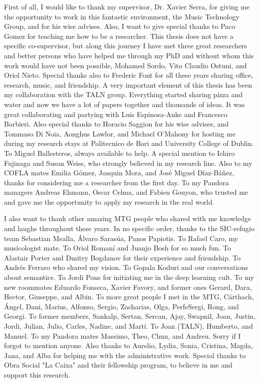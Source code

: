 First of all, I would like to thank my supervisor, Dr. Xavier Serra, for giving me the opportunity to work in this fantastic environment, the Music Technology Group, and for his wise advises. Also, I want to give special thanks to Paco Gomez for teaching me how to be a researcher. This thesis does not have a specific co-supervisor, but along this journey I have met three great researchers and better persons who have helped me through my PhD and without whom this work would have not been possible, Mohamed Sordo, Vito Claudio Ostuni, and Oriol Nieto. 
Special thanks also to Frederic Font for all these years sharing office, research, music, and friendship.
A very important element of this thesis has been my collaboration with the TALN group. Everything started sharing pizza and water and now we have a lot of papers together and thousands of ideas. It was great collaborating and partying with Luis Espinosa-Anke and Francesco Barbieri. Also special thanks to Horacio Saggion for his wise advises, and Tommaso Di Noia, Aonghus Lawlor, and Michael O'Mahony for hosting me during my research stays at Politecnico de Bari and University College of Dublin. To Miguel Ballesteros, always available to help. 
A special mention to Ichiro Fujinaga and Susan Weiss, who strongly believed in my research line. Also to my COFLA mates Emilia Gómez, Joaquin Mora, and José Miguel Díaz-Báñez, thanks for considering me a researcher from the first day.
To my Pandora managers Andreas Ehmann, Oscar Celma, and Fabien Gouyon, who trusted me and gave me the opportunity to apply my research in the real world.

I also want to thank other amazing MTG people who shared with me knowledge and laughs throughout these years. In no specific order, thanks to the SIC-refugio team
Sebastian Mealla, Álvaro Sarasúa, Panos Papiotis. To Rafael Caro, my musicologist mate. To Oriol Romaní and Juanjo Bosh for so much fun. To Alastair Porter and Dmitry Bogdanov for their experience and friendship. To Andrés Ferraro who shared my vision. To Gopala Koduri and our conversations about semantics. To Jordi Pons for initiating me in the deep learning cult. To my new roommates Eduardo Fonseca, Xavier Favory, and former ones Gerard, Dara, Hector, Giuseppe, and Albin. To more great people I met in the MTG, Cárthach, Ángel, Dani, Marius, Alfonso, Sergio, Zacharias, Olga, PerfeSergi, Rong, and Georgi. To former members, Sankalp, Sertan, Sercan, Ajay, Swapnil, Joan, Justin, Jordi, Julian, Julio, Carles, Nadine, and Martí. To Joan (TALN), Humberto, and Manuel. To my Pandora mates Massimo, Theo, Chun, and Andreu. Sorry if I forgot to mention anyone.
Also thanks to Aurelio, Lydia, Sonia, Cristina, Magda, Jana, and Alba for helping me with the administrative work.
Special thanks to Obra Social "La Caixa" and their fellowship program, to believe in me and support this research.

